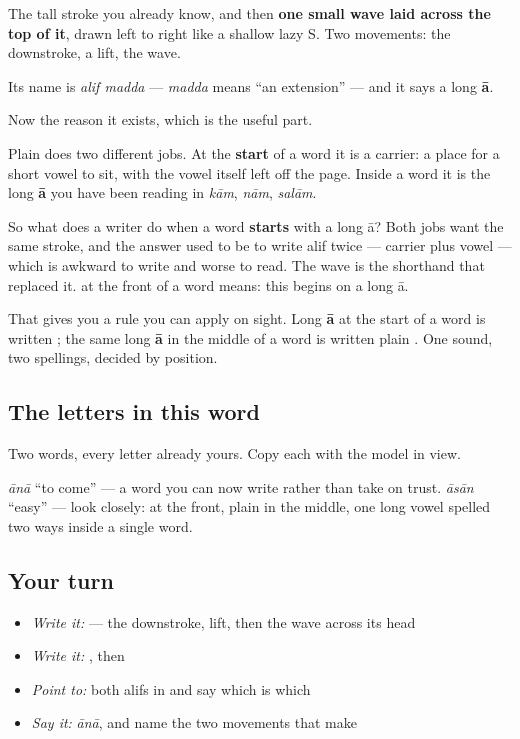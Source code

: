 The tall stroke you already know, and then \textbf{one small wave laid across the top of it}, drawn left to right like a shallow lazy S. Two movements: the downstroke, a lift, the wave.

Its name is \textbf{} \emph{alif madda} — \emph{madda} means \textquotedblleft{}an extension\textquotedblright{} — and it says a long \textbf{ā}.

Now the reason it exists, which is the useful part.

Plain \textbf{} does two different jobs. At the \textbf{start} of a word it is a carrier: a place for a short vowel to sit, with the vowel itself left off the page. Inside a word it is the long \textbf{ā} you have been reading in \emph{kām}, \emph{nām}, \emph{salām}.

So what does a writer do when a word \textbf{starts} with a long ā? Both jobs want the same stroke, and the answer used to be to write alif twice — carrier plus vowel — which is awkward to write and worse to read. The wave is the shorthand that replaced it. \textbf{} at the front of a word means: this begins on a long ā.

That gives you a rule you can apply on sight. Long \textbf{ā} at the start of a word is written \textbf{}; the same long \textbf{ā} in the middle of a word is written plain \textbf{}. One sound, two spellings, decided by position.

\subsection*{The letters in this word}
Two words, every letter already yours. Copy each with the model in view.

\begin{quote}
\end{quote}

\begin{quote}
\end{quote}

\textbf{} \emph{ānā} \textquotedblleft{}to come\textquotedblright{} — a word you can now write rather than take on trust. \textbf{} \emph{āsān} \textquotedblleft{}easy\textquotedblright{} — look closely: \textbf{} at the front, plain \textbf{} in the middle, one long vowel spelled two ways inside a single word.

\subsection*{Your turn}
\begin{itemize}
\raggedright
  \item \emph{Write it:}  — the downstroke, lift, then the wave across its head
  \item \emph{Write it:} , then 
  \item \emph{Point to:} both alifs in  and say which is which
  \item \emph{Say it:} \emph{ānā}, and name the two movements that make \textbf{}
\end{itemize}

